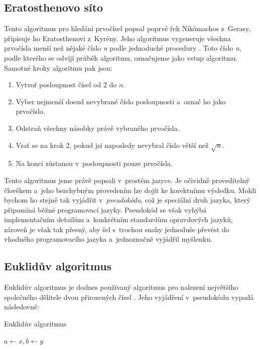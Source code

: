 \documentclass[12pt]{report}			%
\begin{document}
				
				\subsection{Eratosthenovo síto}
				Tento algoritmus pro hledání prvočísel popsal poprvé řek Nikómachos z~Gerasy, připisuje ho Eratosthenovi z~Kyrény. Jeho algoritmus vygeneruje všechna prvočísla menší než nějaké číslo \emph{n} podle jednoduché procedury \cite{history}. Toto číslo \emph{n}, podle kterého se odvíjí průběh algoritmu, označujeme jako vstup algoritmu. \\ Samotné kroky algoritmu pak jsou:
				\begin{enumerate}
				\item Vytvoř posloupnost čísel od 2 do $n$.
				\item Vyber nejmenší dosud nevybrané číslo posloupnosti a~označ ho jako prvočíslo.
				\item Odstraň všechny násobky právě vybraného prvočísla.
				\item Vrať se na krok 2, pokud jsi naposledy nevybral číslo větší než $\sqrt{n}$.
				\item Na konci zůstanou v~posloupnosti pouze prvočísla.
				
				\end{enumerate}
				Tento algoritmus jsme právě popsali v~prostém jazyce. Je očividně proveditelný člověkem a~jeho bezchybným provedením lze dojít ke korektnímu výsledku. Mohli bychom ho stejně tak vyjádřit v~\emph{pseudokódu}, což je speciální druh jazyka, který připomíná běžné programovací jazyky. Pseudokód se však vyhýbá implementačním detailům a~konkrétním standardům opravdových jazyků, zároveň je však tak přesný, aby šel s~trochou snahy jednoduše převést do vhodného programovacího jazyka a~jednoznačně vyjádřil myšlenku. \cite{pruvodce}
				\subsection{Euklidův algoritmus}
				Euklidův algoritmus je dodnes používaný algoritmus pro nalezení největšího společného dělitele dvou přirozených čísel \cite{pruvodce}. 
				Jeho vyjádření v~pseudokódu vypadá následovně:
				
				\begin{algorithm}
			    \caption{Euklidův algoritmus}%
				$a\gets x, b\gets y$\;  				
				\end{algorithm}
				
\end{document}
